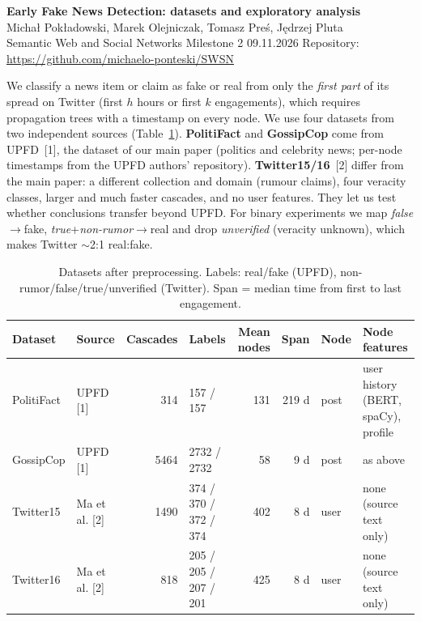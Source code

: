 \documentclass[10pt,a4paper]{article}
\newcommand{\sect}[1]{\vspace{3pt}{\large\bfseries #1}\par\vspace{1pt}}
\begin{document}
{\Large\bfseries Early Fake News Detection: datasets and exploratory analysis}\\[2pt]
Michał Pokładowski, Marek Olejniczak, Tomasz Preś, Jędrzej Pluta\\
{\small Semantic Web and Social Networks \textbullet{} Milestone 2 \textbullet{} 09.11.2026 \hfill Repository: \url{https://github.com/michaelo-ponteski/SWSN}}

\sect{1. Chosen datasets}
We classify a news item or claim as fake or real from only the \emph{first part} of its spread on Twitter
(first $h$ hours or first $k$ engagements), which requires propagation trees with a timestamp on every node.
We use four datasets from two independent sources (Table~\ref{tab:data}).
\textbf{PolitiFact} and \textbf{GossipCop} come from UPFD~[1], the dataset of our main paper
(politics and celebrity news; per-node timestamps from the UPFD authors' repository).
\textbf{Twitter15/16}~[2] differ from the main paper: a different collection and domain (rumour claims), four veracity
classes, larger and much faster cascades, and no user features. They let us test whether conclusions transfer beyond UPFD.
For binary experiments we map \emph{false}$\to$fake, \emph{true}+\emph{non-rumor}$\to$real and drop \emph{unverified}
(veracity unknown), which makes Twitter ${\sim}$2:1 real:fake.

\begin{table}[h]\centering\footnotesize
\caption{Datasets after preprocessing. Labels: real/fake (UPFD), non-rumor/false/true/unverified (Twitter). Span = median time from first to last engagement.}\label{tab:data}
\begin{tabular}{llrlrrll}\toprule
Dataset & Source & Cascades & Labels & Mean nodes & Span & Node & Node features\\\midrule
PolitiFact & UPFD [1] & 314 & 157 / 157 & 131 & 219 d & post & user history (BERT, spaCy), profile\\
GossipCop & UPFD [1] & 5464 & 2732 / 2732 & 58 & 9 d & post & as above\\
Twitter15 & Ma et al. [2] & 1490 & 374 / 370 / 372 / 374 & 402 & 8 d & user & none (source text only)\\
Twitter16 & Ma et al. [2] & 818 & 205 / 205 / 207 / 201 & 425 & 8 d & user & none (source text only)\\\bottomrule
\end{tabular}
\end{table}
\end{document}
